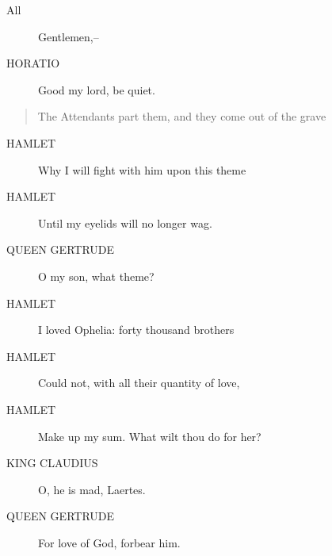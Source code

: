\documentclass{article}
\begin{document}
\begin{description}
            
\item[All] Gentlemen,--
\end{description}
          
\begin{description}
            
\item[HORATIO] Good my lord, be quiet.
\end{description}
          
\begin{quote}
The Attendants part them, and they come out of the grave
\end{quote}
          
\begin{description}
            
\item[HAMLET] Why I will fight with him upon this theme
\item[HAMLET] Until my eyelids will no longer wag.
\end{description}
          
\begin{description}
            
\item[QUEEN GERTRUDE] O my son, what theme?
\end{description}
          
\begin{description}
            
\item[HAMLET] I loved Ophelia: forty thousand brothers
\item[HAMLET] Could not, with all their quantity of love,
\item[HAMLET] Make up my sum. What wilt thou do for her?
\end{description}
          
\begin{description}
            
\item[KING CLAUDIUS] O, he is mad, Laertes.
\end{description}
          
\begin{description}
            
\item[QUEEN GERTRUDE] For love of God, forbear him.
\end{description}
          
\end{document}
